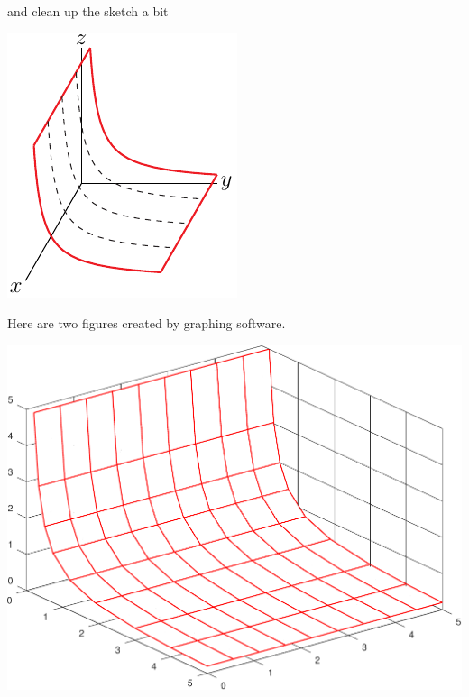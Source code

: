 \begin{eg}[$yz=1$]
\begin{efig}
\begin{center}
\end{center}
\end{efig}
and clean up the sketch a bit
\begin{efig}
\begin{center}
   \includegraphics{hyperbolicCylinderC.pdf}
\end{center}
\end{efig}
Here are two figures created by graphing software.
\begin{efig}
\begin{center}
   \includegraphics[scale=0.4]{hypCylinder.pdf}\quad
\end{center}
\end{efig}

\end{eg}


